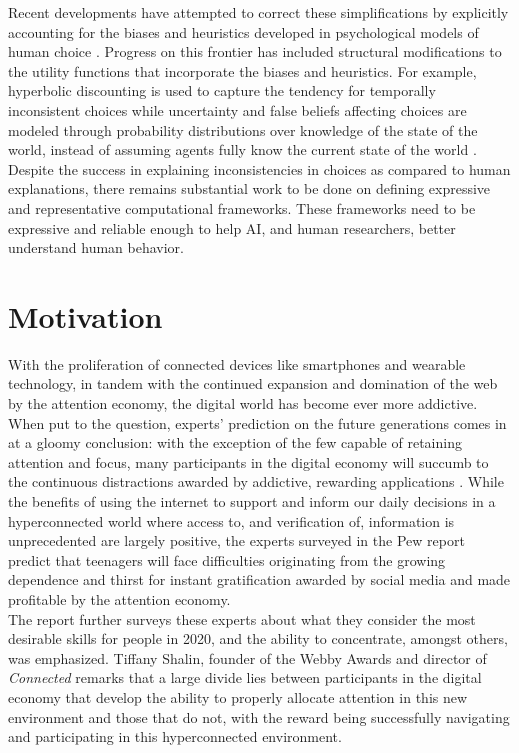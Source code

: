  Recent developments \citep{Evans2015, Jern2017} have attempted to correct these simplifications by explicitly accounting for the biases and heuristics developed in psychological models of human choice \citep{Kahneman1979}. Progress on this frontier has included structural modifications to the utility functions that incorporate the biases and heuristics. For example, hyperbolic discounting \citep{ainslie2001breakdown} is used to capture the tendency for temporally inconsistent choices  while uncertainty and false beliefs affecting choices are modeled through probability distributions over knowledge of the state of the world, instead of assuming agents fully know the current state of the world \citep{baker2014modeling}.\\

 Despite the success in explaining inconsistencies in choices as compared to human explanations, there remains substantial work to be done on defining expressive and representative computational frameworks. These frameworks need to be expressive and reliable enough to help AI, and human researchers, better understand human behavior. 

 \section{Motivation}
 With the proliferation of connected devices like smartphones and wearable technology, in tandem with the continued expansion and domination of the web by the attention economy, the digital world has become ever more addictive. When put to the question, experts' prediction on the future generations comes in at a gloomy conclusion: with the exception of the few capable of retaining attention and focus, many participants in the digital economy will succumb to the continuous distractions awarded by addictive, rewarding applications \citep{anderson2012millennials}. While the benefits of using the internet to support and inform our daily decisions in a hyperconnected world where access to, and verification of, information is unprecedented are largely positive, the experts surveyed in the Pew report predict that teenagers will face difficulties originating from the growing dependence and thirst for instant gratification awarded by social media and made profitable by the attention economy.\\

 The report further surveys these experts about what they consider the most desirable skills for people in 2020, and the ability to concentrate, amongst others, was emphasized. Tiffany Shalin, founder of the Webby Awards and director of \textit{Connected} remarks that a large divide lies between participants in the digital economy that develop the ability to properly allocate attention in this new environment and those that do not, with the reward being successfully navigating and participating in this hyperconnected environment.\\

